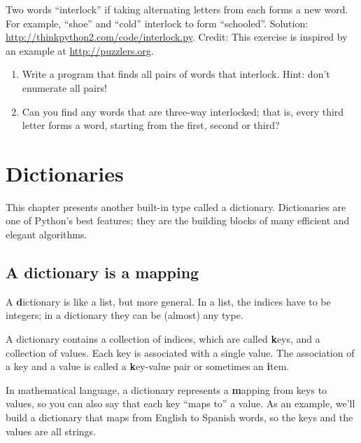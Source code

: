 \documentclass[
DIV=11,
fontsize=13,
twoside,
headinclude=false,
titlepage=firstiscover,
abstract=true,
headsepline=true,
footsepline=true,
chapterprefix=true, %
headings=big,
bibliography=totoc,%
captions=tableheading
]{scrbook}
\theoremstyle{definition}
\begin{document}
\begin{exercise}
\normalfont
{}

Two words ``interlock'' if taking alternating letters from each forms
a new word.  For example, ``shoe'' and ``cold''
interlock to form ``schooled''.
Solution: \url{http://thinkpython2.com/code/interlock.py}.
Credit: This exercise is inspired by an example at \url{http://puzzlers.org}.

\begin{enumerate}

\item Write a program that finds all pairs of words that interlock.
  Hint: don't enumerate all pairs!

\item Can you find any words that are three-way interlocked; that is,
  every third letter forms a word, starting from the first, second or
  third?

\end{enumerate}
\end{exercise}


\chapter{Dictionaries}

This chapter presents another built-in type called a dictionary.
Dictionaries are one of Python's best features; they are the
building blocks of many efficient and elegant algorithms.


\section{A dictionary is a mapping}

A {\textbf dictionary} is like a list, but more general.  In a list,
the indices have to be integers; in a dictionary they can
be (almost) any type.

A dictionary contains a collection of indices, which are called {\textbf
  keys}, and a collection of values.  Each key is associated with a
single value.  The association of a key and a value is called a {\textbf
  key-value pair} or sometimes an {\textbf item}.  

In mathematical language, a dictionary represents a {\textbf mapping}
from keys to values, so you can also say that each key
``maps to'' a value.
As an example, we'll build a dictionary that maps from English
to Spanish words, so the keys and the values are all strings.
\end{document}
